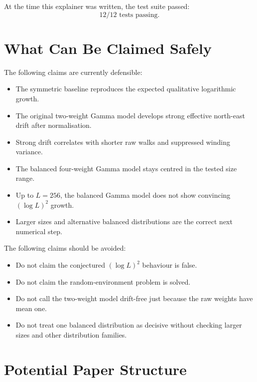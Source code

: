 \documentclass[11pt]{article}
\begin{document}
At the time this explainer was written, the test suite passed:
\[
  12/12 \text{ tests passing.}
\]

\section{What Can Be Claimed Safely}

The following claims are currently defensible:
\begin{itemize}
  \item The symmetric baseline reproduces the expected qualitative logarithmic
        growth.
  \item The original two-weight Gamma model develops strong effective
        north-east drift after normalisation.
  \item Strong drift correlates with shorter raw walks and suppressed winding
        variance.
  \item The balanced four-weight Gamma model stays centred in the tested size
        range.
  \item Up to $L=256$, the balanced Gamma model does not show convincing
        $(\log L)^2$ growth.
  \item Larger sizes and alternative balanced distributions are the correct
        next numerical step.
\end{itemize}

The following claims should be avoided:
\begin{itemize}
  \item Do not claim the conjectured $(\log L)^2$ behaviour is false.
  \item Do not claim the random-environment problem is solved.
  \item Do not call the two-weight model drift-free just because the raw
        weights have mean one.
  \item Do not treat one balanced distribution as decisive without checking
        larger sizes and other distribution families.
\end{itemize}

\section{Potential Paper Structure}
\end{document}
